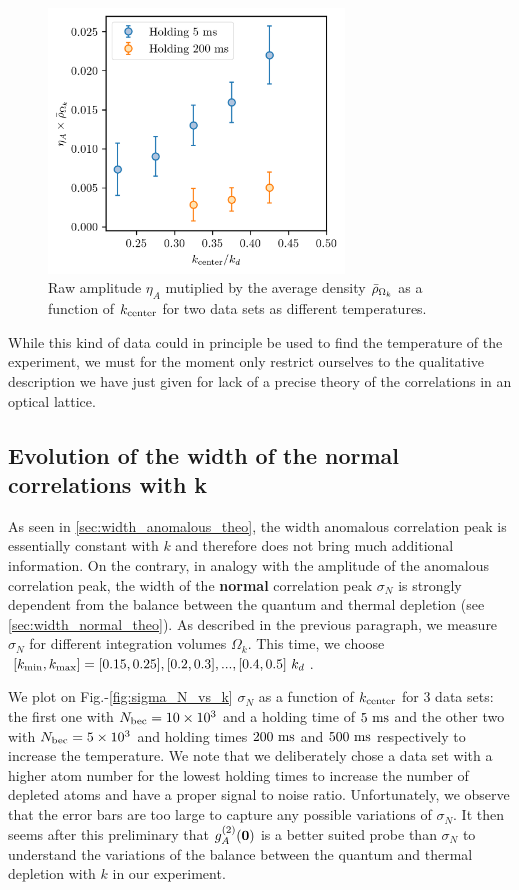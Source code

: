 \begin{figure}
    \centering
    \includegraphics[width=0.7\textwidth]{Fig/Chapter4/eta_A_vs_k.png}
    \caption[Evolution of the anomalous correlations amplitudes with $k$]{Raw amplitude $\eta_A$ mutiplied by the average density $\bar{\rho}_{\Omega_k}$ as a function of $k_{\rm{center}}$ for two data sets as different temperatures.}
    \label{fig:eta_A_vs_k}
\end{figure}

While this kind of data could in principle be used to find the temperature of the experiment, we must for the moment only restrict ourselves to the qualitative description we have just given for lack of a precise theory of the correlations in an optical lattice.

\subsection{Evolution of the width of the normal correlations with k}

As seen in \ref{sec:width_anomalous_theo}, the width anomalous correlation peak is essentially constant with $k$ and therefore does not bring much additional information. On the contrary, in analogy with the amplitude of the anomalous correlation peak, the width of the \textbf{normal} correlation peak $\sigma_N$ is strongly dependent from the balance between the quantum and thermal depletion (see \ref{sec:width_normal_theo}). As described in the previous paragraph, we measure $\sigma_N$ for different integration volumes $\Omega_k$. This time, we choose $[k_{\rm{min}},k_{\rm{max}}]=[0.15,0.25],[0.2,0.3],...,[0.4,0.5] \ k_d$.

We plot on Fig.-\ref{fig:sigma_N_vs_k} $\sigma_N$ as a function of $k_{\rm{center}}$ for 3 data sets: the first one with $N_{\rm{bec}}=10 \times 10^3$ and a holding time of $5 \ \rm{ms}$ and the other two with $N_{\rm{bec}}=5 \times 10^3$ and holding times $200 \ \rm{ms}$ and $500 \ \rm{ms}$ respectively to increase the temperature. We note that we deliberately chose a data set with a higher atom number for the lowest holding times to increase the number of depleted atoms and have a proper signal to noise ratio. Unfortunately, we observe that the error bars are too large to capture any possible variations of $\sigma_N$. It then seems after this preliminary that $g^{(2)}_A (\bm{0})$ is a better suited probe than $\sigma_N$ to understand the variations of the balance between the quantum and thermal depletion with $k$ in our experiment.

